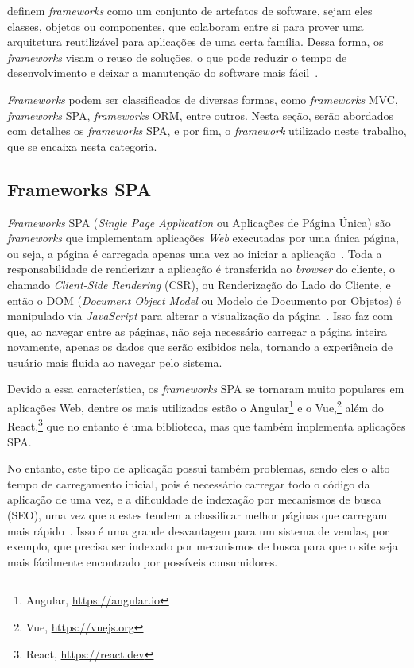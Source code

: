  definem \textit{frameworks} como um conjunto de artefatos de software, sejam eles
classes, objetos ou componentes, que colaboram entre si para prover uma arquitetura reutilizável
para aplicações de uma certa família. Dessa forma, os \textit{frameworks} visam o reuso de soluções, o que
pode reduzir o tempo de desenvolvimento e deixar a manutenção do software mais fácil~\cite{gamma:2000}.

\textit{Frameworks} podem ser classificados de diversas formas, como \textit{frameworks} MVC,
\textit{frameworks} SPA, \textit{frameworks} ORM, entre outros. Nesta seção, serão abordados
com detalhes os \textit{frameworks} SPA, e por fim, o \textit{framework} utilizado neste trabalho,
que se encaixa nesta categoria.

\subsection{Frameworks SPA}
\label{sec-fundteo-framework-spa}

\textit{Frameworks} SPA (\textit{Single Page Application} ou Aplicações de Página Única) são \textit{frameworks} que implementam
aplicações \textit{Web} executadas por uma única página, ou seja, a página é carregada apenas uma vez 
ao iniciar a aplicação~\cite{emmitt:2015}. Toda a responsabilidade de renderizar a aplicação é
transferida ao \textit{browser} do cliente, o chamado \textit{Client-Side Rendering} (CSR), ou Renderização do Lado do Cliente,
e então o DOM (\textit{Document Object Model} ou Modelo de Documento por Objetos) é manipulado via \textit{JavaScript} para alterar a visualização da 
página~\cite{emmitt:2015,konshin:2018}. Isso faz com que, ao navegar entre as páginas, não 
seja necessário carregar a página inteira novamente, apenas os dados que serão exibidos nela, 
tornando a experiência de usuário mais fluida ao navegar pelo sistema. 

Devido a essa característica, os \textit{frameworks} SPA se tornaram muito populares em aplicações
Web, dentre os mais utilizados estão o Angular\footnote{Angular, \url{https://angular.io}}
e o Vue,\footnote{Vue, \url{https://vuejs.org}} além do React,\footnote{React, \url{https://react.dev}}
que no entanto é uma biblioteca, mas que também implementa aplicações SPA.

No entanto, este tipo de aplicação possui também problemas, sendo eles o alto tempo de carregamento
inicial, pois é necessário carregar todo o código da aplicação de uma vez, e a dificuldade de
indexação por mecanismos de busca (SEO), uma vez que a estes tendem a classificar melhor
páginas que carregam mais rápido~\cite{konshin:2018}. Isso é uma grande desvantagem para um sistema
de vendas, por exemplo, que precisa ser indexado por mecanismos de busca para que o site seja mais
fácilmente encontrado por possíveis consumidores.


